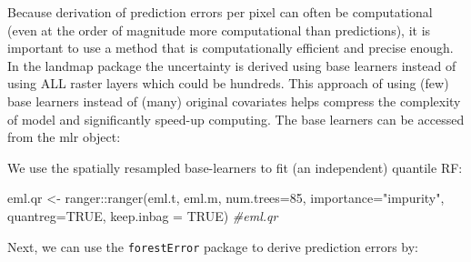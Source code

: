 \documentclass[
  graybox,natbib,nospthms]{svmono}
\newenvironment{Shaded}{\begin{snugshade}}{\end{snugshade}}
\newcommand{\AttributeTok}[1]{\textcolor[rgb]{0.61,0.61,0.61}{#1}}
\newcommand{\CommentTok}[1]{\textcolor[rgb]{0.37,0.37,0.37}{\textit{#1}}}
\newcommand{\ConstantTok}[1]{\textcolor[rgb]{0,0,0}{#1}}
\newcommand{\DecValTok}[1]{\textcolor[rgb]{0.06,0.06,0.06}{#1}}
\newcommand{\FunctionTok}[1]{\textcolor[rgb]{0,0,0}{#1}}
\newcommand{\NormalTok}[1]{#1}
\newcommand{\OtherTok}[1]{\textcolor[rgb]{0.37,0.37,0.37}{#1}}
\newcommand{\SpecialCharTok}[1]{\textcolor[rgb]{0,0,0}{#1}}
\newcommand{\StringTok}[1]{\textcolor[rgb]{0.5,0.5,0.5}{#1}}
\begin{document}
Because derivation of prediction errors per pixel can often be computational
(even at the order of magnitude more computational than predictions), it is important
to use a method that is computationally efficient and precise enough. In the
landmap package the uncertainty is derived using base learners instead of using
ALL raster layers which could be hundreds. This approach of using (few) base learners
instead of (many) original covariates helps compress the complexity of model and
significantly speed-up computing. The base learners can be accessed from the
mlr object:

\begin{Shaded}
\end{Shaded}

We use the spatially resampled base-learners to fit (an independent) quantile RF:

\begin{Shaded}
\begin{Highlighting}[]
\NormalTok{eml.qr }\OtherTok{\textless{}{-}}\NormalTok{ ranger}\SpecialCharTok{::}\FunctionTok{ranger}\NormalTok{(eml.t, eml.m, }\AttributeTok{num.trees=}\DecValTok{85}\NormalTok{, }\AttributeTok{importance=}\StringTok{"impurity"}\NormalTok{, }
                         \AttributeTok{quantreg=}\ConstantTok{TRUE}\NormalTok{, }\AttributeTok{keep.inbag =} \ConstantTok{TRUE}\NormalTok{)}
\CommentTok{\#eml.qr}
\end{Highlighting}
\end{Shaded}

Next, we can use the \texttt{forestError} package to derive prediction errors by:
\end{document}
